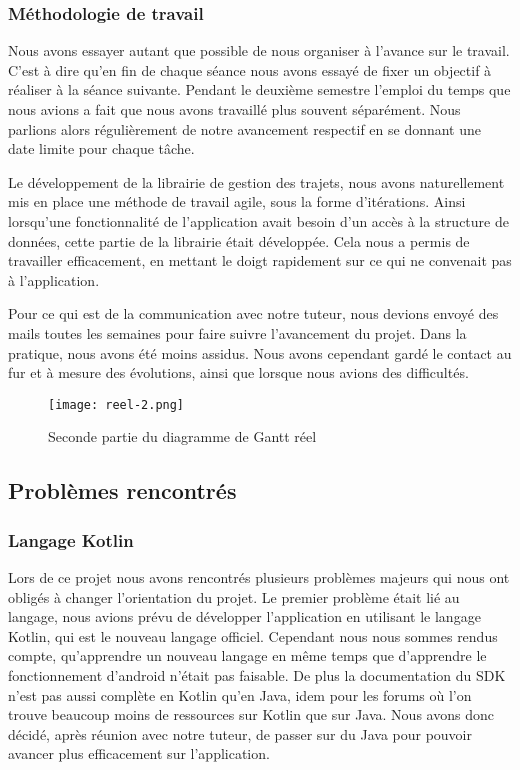 \subsubsection{Méthodologie de travail}
Nous avons essayer autant que possible de nous organiser à l'avance sur le travail. C'est à dire qu'en fin de chaque séance nous avons essayé de fixer un objectif à réaliser à la séance suivante.
Pendant le deuxième semestre l'emploi du temps que nous avions a fait que nous avons travaillé plus souvent séparément. Nous parlions alors régulièrement de notre avancement respectif en se donnant une date limite pour chaque tâche.
\par
Le développement de la librairie de gestion des trajets, nous avons naturellement mis en place une méthode de travail agile, sous la forme d'itérations. Ainsi lorsqu'une fonctionnalité de l'application avait besoin d'un accès à la structure de données, cette partie de la librairie était développée.
Cela nous a permis de travailler efficacement, en mettant le doigt rapidement sur ce qui ne convenait pas à l'application.
\par
Pour ce qui est de la communication avec notre tuteur, nous devions envoyé des mails toutes les semaines pour faire suivre l'avancement du projet. Dans la pratique, nous avons été moins assidus. Nous avons cependant gardé le contact au fur et à mesure des évolutions, ainsi que lorsque nous avions des difficultés.
\vfill
\begin{figure}[!h]
    \begin{center}
        \texttt{[image: reel-2.png]}
        \caption{Seconde partie du diagramme de Gantt réel}
    \end{center}
\end{figure}
\newpage




\subsection{Problèmes rencontrés}
\subsubsection{Langage Kotlin}
Lors de ce projet nous avons rencontrés plusieurs problèmes majeurs qui nous ont obligés à changer l'orientation du projet.
Le premier problème était lié au langage, nous avions prévu de développer l'application en utilisant le langage Kotlin, qui est le nouveau langage officiel.
Cependant nous nous sommes rendus compte, qu'apprendre un nouveau langage en même temps que d'apprendre le fonctionnement d'android n'était pas faisable.
De plus la documentation du SDK n'est pas aussi complète en Kotlin qu'en Java, idem pour les forums où l'on trouve beaucoup moins de ressources sur Kotlin que sur Java.
Nous avons donc décidé, après réunion avec notre tuteur, de passer sur du Java pour pouvoir avancer plus efficacement sur l'application.

